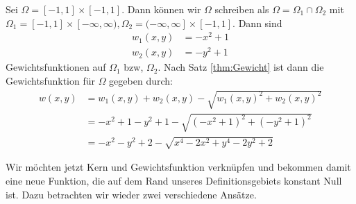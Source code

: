 \begin{example}
Sei $\Omega = [-1,1] \times [-1,1]$. Dann können wir $\Omega$ schreiben als $\Omega = \Omega_1  \cap \Omega_2$ mit $\Omega_1 = [-1,1] \times [- \infty, \infty), \Omega_2 =   (- \infty, \infty] \times [-1,1]$.
Dann sind 
\begin{align*}
w_1(x,y) &= -x^2 +1\\
w_2(x,y) &= -y^2 +1 
\end{align*}
Gewichtsfunktionen auf $\Omega_1$ bzw, $\Omega_2$. Nach Satz \ref{thm:Gewicht} ist dann die Gewichtsfunktion für $\Omega$ gegeben durch:
\begin{align*}
w(x,y) &= w_1(x,y) + w_2(x,y) - \sqrt{w_1(x,y)^2 + w_2(x,y)^2}\\
&= -x^2 +1 -y^2 +1 - \sqrt{(-x^2+1)^2 + (-y^2+1)^2}\\
&= -x^2-y^2+2 - \sqrt{x^4 -2x^2 + y^4 -2y^2+2}
\end{align*}
\end{example}
Wir möchten jetzt Kern und Gewichtsfunktion verknüpfen und bekommen damit eine neue Funktion, die auf dem Rand unseres Definitionsgebiets konstant Null ist. Dazu betrachten wir wieder zwei verschiedene Ansätze.

